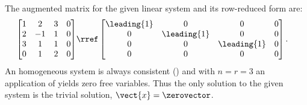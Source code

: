 The augmented matrix for the given linear system and its row-reduced form are:
\begin{align*}
\begin{bmatrix}
1 & 2 & 3 & 0\\
2 & -1 & 1 & 0\\
3 & 1 & 1 & 0\\
0 & 1 & 2 & 0
\end{bmatrix}
&\rref
\begin{bmatrix}
\leading{1} & 0 & 0 & 0\\
0 & \leading{1} & 0  & 0\\
0 & 0 & \leading{1} & 0\\
0 & 0 & 0 & 0
\end{bmatrix}.
\end{align*}
An homogeneous system is always consistent () and with $n=r=3$ an application of  yields zero free variables. Thus the only solution to the given system is the trivial solution, $\vect{x} = \zerovector$.